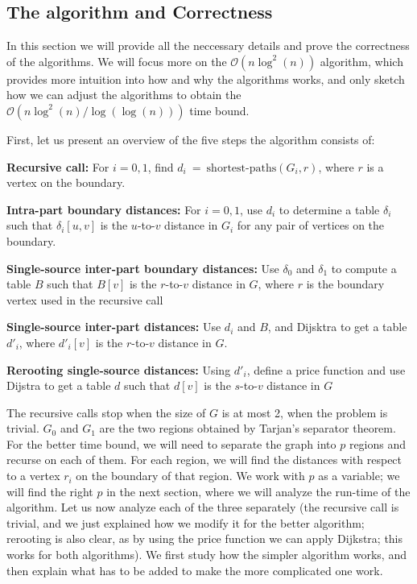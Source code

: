\documentclass[11pt]{article}
\begin{document}
\subsection{The algorithm and Correctness}
\label{sec: details and overview}

In this section we will provide all the neccessary details and prove the correctness of the algorithms. We will focus more on the $\mathcal{O}(n\log^2(n))$  algorithm, which provides more intuition into how and why the algorithms works, and only sketch how we can adjust the algorithms to obtain the $\mathcal{O}(n\log^2(n)/\log(\log(n)))$ time bound.

First, let us present an overview of the five steps the algorithm consists of:

\textbf{Recursive call:} For $i=0,1$, find $d_i\ =\ \text{shortest-paths}(G_i,r)$, where $r$ is a vertex on the boundary.

\textbf{Intra-part boundary distances:} For $i=0,1$, use $d_i$ to determine a table $\delta_i$ such that $\delta_i[u,v]$ is the $u$-to-$v$ distance in $G_i$ for any pair of vertices on the boundary.

\textbf{Single-source inter-part boundary distances:} Use $\delta_0$ and $\delta_1$ to compute a table $B$ such that $B[v]$ is the $r$-to-$v$ distance in $G$, where $r$ is the boundary vertex used in the recursive call

\textbf{Single-source inter-part distances:} Use $d_i$ and $B$, and Dijsktra to get a table $d'_i$, where $d'_i[v]$ is the $r$-to-$v$ distance in $G$.

\textbf{Rerooting single-source distances:} Using $d'_i$, define a price function and use Dijstra to
get a table $d$ such that $d[v]$ is the $s$-to-$v$ distance in $G$

The recursive calls stop when the size of $G$ is at most 2, when the problem is trivial. $G_0$ and
$G_1$ are the two regions obtained by Tarjan's separator theorem. For the better time bound,
we will need to separate the graph into $p$ regions and recurse on each of them. For each region, we will find the distances with respect to a vertex $r_i$ on the boundary of that region. We work with $p$ as a variable; we will find the right $p$ in the next section, where we will analyze the run-time of the algorithm. Let us now analyze each of the three separately (the recursive call is trivial, and we just explained how we modify it for the better algorithm; rerooting is also clear, as by using the price function we can apply Dijkstra; this works for both algorithms). We first study how the simpler algorithm works, and then explain what has to be added to make the more complicated one work.
\end{document}
